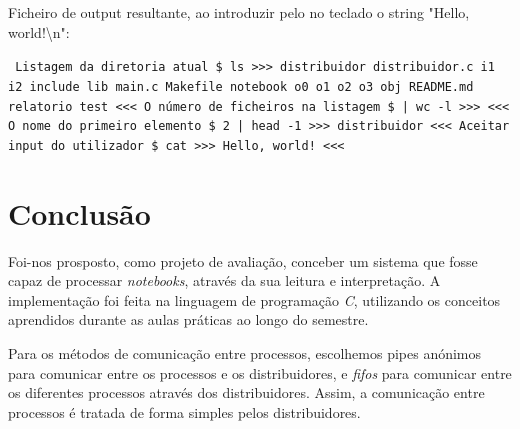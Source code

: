 \documentclass[12pt]{report}
\newcommand\tab[1][0.5cm]{\hspace*{#1}}
\begin{document}
\noindent Ficheiro de output resultante, ao introduzir pelo no teclado o string "Hello, world!\textbackslash n":

\texttt{
\newline Listagem da diretoria atual
\newline \$ ls
\newline >>>
\newline distribuidor \newline distribuidor.c \newline i1 \newline i2
\newline include \newline lib \newline main.c \newline Makefile
\newline notebook \newline o0 \newline o1 \newline o2 \newline o3
\newline obj \newline README.md \newline relatorio \newline test
\newline <<<
\newline O número de ficheiros na listagem
\newline \$ | wc -l
\newline >>>
\newline <<<
\newline O nome do primeiro elemento
\newline \$ 2 | head -1
\newline >>>
\newline distribuidor
\newline <<<
\newline Aceitar input do utilizador
\newline \$ cat
\newline >>>
\newline Hello, world!
\newline <<<
\newline
}

\chapter{Conclusão}
\label{sec:conclusao}

\tab Foi-nos prosposto, como projeto de avaliação, conceber um sistema que fosse capaz de processar \textit{notebooks}, através da sua leitura e  interpretação. A implementação foi feita na linguagem de programação \textit{C}, utilizando os conceitos aprendidos durante as aulas práticas ao longo do semestre. 

Para os métodos de comunicação entre processos, escolhemos pipes anónimos para comunicar entre os processos e os distribuidores, e \textit{fifos} para comunicar entre os diferentes processos através dos distribuidores. Assim, a comunicação entre processos é tratada de forma simples pelos distribuidores.
\end{document}
